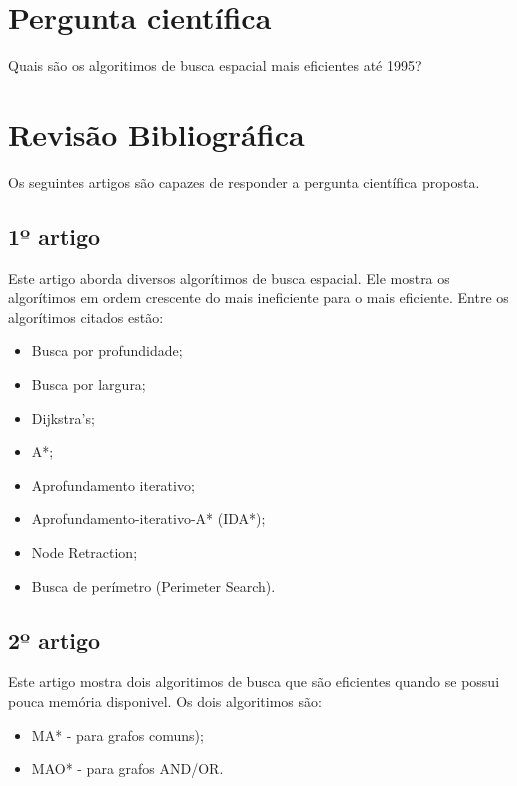 \documentclass[a4paper]{article}
\begin{document}

\section{Pergunta científica}

Quais são os algoritimos de busca espacial mais eficientes até 1995?


\section{Revisão Bibliográfica}
Os seguintes artigos são capazes de responder a pergunta científica proposta.
\vspace{3mm}

\subsection{1º artigo}

Este artigo \cite{Korf1995} aborda diversos algorítimos de busca espacial. Ele mostra os algorítimos em ordem crescente do mais ineficiente para o mais eficiente. Entre os algorítimos citados estão:

\begin{itemize}

\item Busca por profundidade;
\item Busca por largura;
\item Dijkstra's;
\item A*;
\item Aprofundamento iterativo;
\item Aprofundamento-iterativo-A* (IDA*);
\item Node Retraction;
\item Busca de perímetro (Perimeter Search).

\end{itemize}

\subsection{2º artigo}

Este artigo \cite{Chakrabarti1989} mostra dois algoritimos de busca que são eficientes
quando se possui pouca memória disponivel. Os dois algoritimos são:

\begin{itemize}

\item MA* - para grafos comuns);
\item MAO* - para grafos AND/OR.

\end{itemize}
\end{document}
